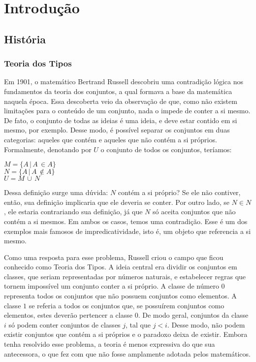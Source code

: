 \documentclass[12pt, oneside, a4paper,english,brazil]{abntex2}
\begin{document}
\imprimircapa
\imprimirfolhaderosto

\tableofcontents* %

\glsaddall
\printglossaries

\textual

\chapter{Introdução}
\section{Hist\'oria}

\subsection*{Teoria dos Tipos}

\qquad Em 1901, o matemático Bertrand Russell descobriu uma contradição lógica nos
fundamentos da teoria dos conjuntos, a qual formava a base da matemática naquela época.
Essa descoberta veio da observação de que, como não existem limitações para o conteúdo
de um conjunto, nada o impede de conter a si mesmo. De fato, o conjunto de todas as
ideias é uma ideia, e deve estar contido em si mesmo, por exemplo. Desse modo, é possível
separar os conjuntos em duas categorias: aqueles que contém e aqueles que não contém a
si próprios. Formalmente, denotando por $U$ o conjunto de todos os conjuntos, teríamos:

\begin{center}
  $M = \{A\, |\, A\, \in A\}$ \\
  $N = \{A\, |\, A\, \notin A\}$ \\
  $U = M\, \cup\, N$
\end{center}

\qquad Dessa definição surge uma dúvida: $N$ contém a si próprio? Se ele não contiver,
então, sua definição implicaria que ele deveria se conter. Por outro lado, se $N \in N$, ele
estaria contrariando sua definição, já que $N$ só aceita conjuntos que não contém a si
mesmos. Em ambos os casos, temos uma contradição. Esse é um dos exemplos mais
famosos de impredicatividade, isto é, um objeto que referencia a si mesmo.

\qquad Como uma resposta para esse problema, Russell criou o campo que ficou conhecido
como Teoria dos Tipos. A ideia central era dividir os conjuntos em classes, que seriam
representadas por números naturais, e estabelecer regras que tornem impossível um
conjunto conter a si próprio. A classe de número $0$ representa todos os conjuntos que
não possuem conjuntos como elementos. A classe $1$ se referia a todos os conjuntos que,
se possuírem conjuntos como elementos, estes deverão pertencer a classe $0$. De modo
geral, conjuntos da classe $i$ só podem conter conjuntos de classes $j$, tal que $j < i$. Desse
modo, não podem existir conjuntos que contém a si próprios e o paradoxo deixa de existir.
Embora tenha resolvido esse problema, a teoria é menos expressiva do que sua antecessora,
o que fez com que não fosse amplamente adotada pelos matemáticos.
\end{document}
